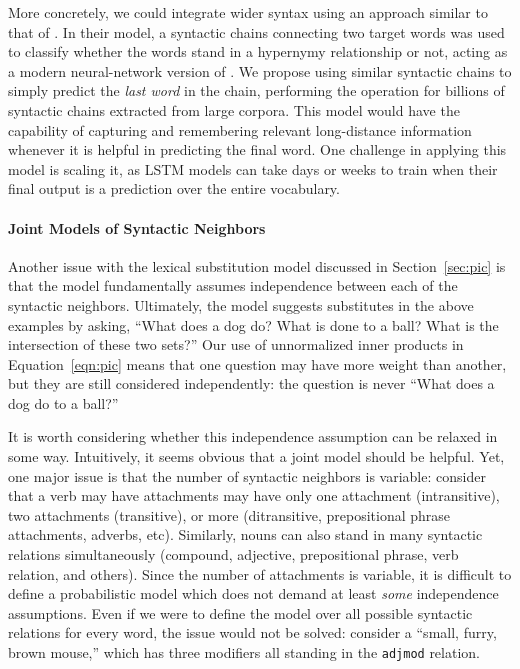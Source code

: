 \documentclass[12pt]{article}
\begin{document}
More concretely, we could integrate wider syntax using an approach similar to
that of . In their model, a syntactic chains
connecting two target words was used to classify whether the words stand in a
hypernymy relationship or not, acting as a modern neural-network version of
. We propose using similar syntactic chains to simply
predict the {\em last word} in the chain, performing the operation for billions
of syntactic chains extracted from large corpora. This model would have the
capability of capturing and remembering relevant long-distance information
whenever it is helpful in predicting the final word. One challenge
in applying this model is scaling it, as LSTM models can take days or weeks
to train when their final output is a prediction over the entire vocabulary.

\paragraph{Joint Models of Syntactic Neighbors}

Another issue with the lexical substitution model discussed in Section~\ref{sec:pic}
is that the model fundamentally assumes independence between each of the syntactic
neighbors. Ultimately, the model suggests substitutes in the above examples by
asking, ``What does a dog do? What is done to a ball? What is the intersection
of these two sets?'' Our use of unnormalized inner products in Equation~\ref{eqn:pic}
means that one question may have more weight than another, but they
are still considered independently: the question is never ``What does a dog do
to a ball?''

It is worth considering whether this independence assumption can be relaxed
in some way. Intuitively, it seems obvious that a joint model should be helpful.
Yet, one major issue is that the number of syntactic neighbors is variable:
consider that a verb may have attachments may have only one attachment (intransitive),
two attachments (transitive), or more (ditransitive, prepositional phrase attachments,
adverbs, etc). Similarly, nouns can also stand in many syntactic relations
simultaneously (compound, adjective, prepositional phrase, verb relation, and
others). Since the number of attachments is variable, it is difficult to define
a probabilistic model which does not demand at least {\em some}
independence assumptions. Even if we were to define the model over all possible
syntactic relations for every word, the issue would not be solved: consider
a ``small, furry, brown mouse,'' which has three modifiers all standing
in the {\tt adjmod} relation.
\end{document}
